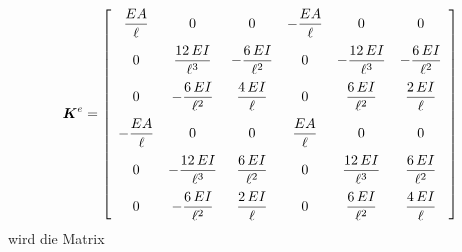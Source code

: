 \begin{align}\label{Eq167}
\vek K^e = \left[ \barr{c c c c c c} \displaystyle{\frac{EA}{\ell}} & \displaystyle{0} & \displaystyle{0} &-\displaystyle{\frac{EA}{\ell}} & \displaystyle{0} & \displaystyle{0} \vspace{0.2cm}\\
\displaystyle{0} & \displaystyle{\frac{12\,EI}{\ell^3}} & - \displaystyle{\frac{6\,EI}{\ell^2}} &\displaystyle{0} &- \displaystyle{\frac{12\,EI}{\ell^3}} &  - \displaystyle{\frac{6\,EI}{\ell^2}} \vspace{0.2cm}\\
\displaystyle{0} & - \displaystyle{\frac{6\,EI}{\ell^2}} & \displaystyle{\frac{4\,EI}{\ell}} & \displaystyle{0}  & \displaystyle{\frac{6\,EI}{\ell^2}} & \displaystyle{\frac{2\,EI}{\ell}}\vspace{0.2cm}\\
-\displaystyle{\frac{EA}{\ell}} & \displaystyle{0} & \displaystyle{0} &\displaystyle{\frac{EA}{\ell}} & \displaystyle{0} & \displaystyle{0} \vspace{0.2cm}\\
\displaystyle{0} & -\displaystyle{\frac{12\,EI}{\ell^3}} & \displaystyle{\frac{6\,EI}{\ell^2}} &\displaystyle{0}  &\displaystyle{\frac{12\,EI}{\ell^3}} &   \displaystyle{\frac{6\,EI}{\ell^2}}\vspace{0.2cm}\\
\displaystyle{0} & - \displaystyle{\frac{6\,EI}{\ell^2}} & \displaystyle{\frac{2\,EI}{\ell}} & \displaystyle{0}  & \displaystyle{\frac{6\,EI}{\ell^2}} & \displaystyle{\frac{4\,EI}{\ell}} \earr \right]
\end{align}
wird die Matrix
\renewcommand{\arraystretch}{2.2}

